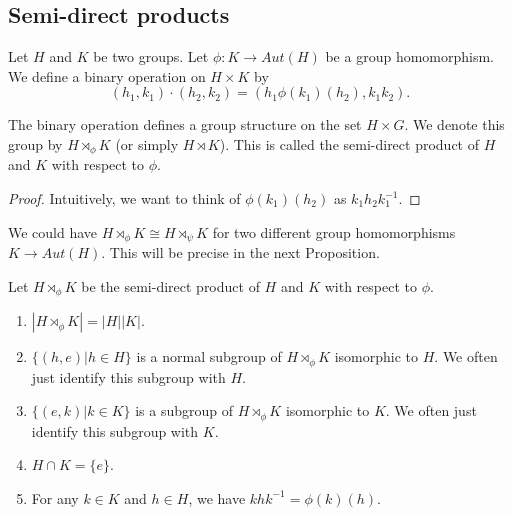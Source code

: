 \subsection{Semi-direct products}

\begin{defi}
    Let $H$ and $K$ be two groups. Let $\phi : K \rightarrow Aut(H)$ be a group homomorphism. We define a binary operation on $H \times K$ by
    \[
        (h_1, k_1) \cdot (h_2, k_2) = (h_1 \phi(k_1)(h_2), k_1k_2).
    \]
\end{defi}

\begin{thm}
    The binary operation defines a group structure on the set $H \times G$. We denote this group by $H \rtimes_{\phi} K$ (or simply $H \rtimes K$). This is called the semi-direct product of $H$ and $K$ with respect to $\phi$.
\end{thm}
\begin{proof}
    Intuitively, we want to think of $\phi(k_1)(h_2)$ as $k_1 h_2 k_1^{-1}$.
\end{proof}

\begin{remark}
    We could have $H \rtimes_{\phi} K \cong H \rtimes_{\psi} K$ for two different group homomorphisms $K \rightarrow Aut(H)$. This will be precise in the next Proposition.
\end{remark}

\begin{prop}Let $H \rtimes_{\phi} K$ be the semi-direct product of $H$ and $K$ with respect to $\phi$.
    \begin{enumerate}
        \item $|H \rtimes_{\phi} K| = |H| |K|$.
        \item $\{(h,e) \vert h \in H\}$ is  a normal subgroup of $H \rtimes_{\phi} K$ isomorphic to $H$. We often just identify this subgroup with $H$.
        \item $\{(e,k) \vert k \in K\}$ is  a subgroup of $H \rtimes_{\phi} K$ isomorphic to $K$. We often just identify this subgroup with $K$.
        \item $H \cap K = \{e\}$.
        \item For any $k \in K$ and $h \in H$, we have $k h k^{-1} = \phi(k)(h)$.
    \end{enumerate}
\end{prop}

